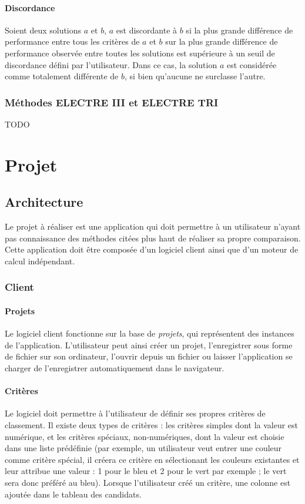 \documentclass[a4paper]{article}
\begin{document}
\paragraph{Discordance}
Soient deux solutions \(a\) et \(b\), \(a\) est discordante à \(b\) si la plus grande différence de performance entre tous les critères de \(a\) et \(b\) sur la plus grande différence de performance observée entre toutes les solutions est supérieure à un seuil de discordance défini par l'utilisateur. Dans ce cas, la solution \(a\) est considérée comme totalement différente de \(b\), si bien qu'aucune ne surclasse l'autre.

\subsubsection{Méthodes ELECTRE III et ELECTRE TRI}

TODO

\newpage

\section{Projet}

\subsection{Architecture}

Le projet à réaliser est une application qui doit permettre à un utilisateur n'ayant pas connaissance des méthodes citées plus haut de réaliser sa propre comparaison. Cette application doit être composée d'un logiciel client ainsi que d'un moteur de calcul indépendant.

\subsubsection{Client}

\paragraph{Projets} Le logiciel client fonctionne sur la base de \textit{projets}, qui représentent des instances de l'application. L'utilisateur peut ainsi créer un projet, l'enregistrer sous forme de fichier sur son ordinateur, l'ouvrir depuis un fichier ou laisser l'application se charger de l'enregistrer automatiquement dans le navigateur.

\paragraph{Critères} Le logiciel doit permettre à l'utilisateur de définir ses propres critères de classement. Il existe deux types de critères : les critères simples dont la valeur est numérique, et les critères spéciaux, non-numériques, dont la valeur est choisie dans une liste prédéfinie (par exemple, un utilisateur veut entrer une couleur comme critère spécial, il créera ce critère en sélectionant les couleurs existantes et leur attribue une valeur : 1 pour le bleu et 2 pour le vert par exemple ; le vert sera donc préféré au bleu). Lorsque l'utilisateur créé un critère, une colonne est ajoutée dans le tableau des candidats. 
\end{document}
